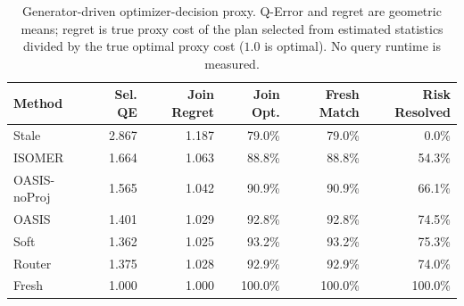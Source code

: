 \begin{table}[t]
  \centering
  \small
  \caption{Generator-driven optimizer-decision proxy. Q-Error and regret are geometric means; regret is true proxy cost of the plan selected from estimated statistics divided by the true optimal proxy cost ($1.0$ is optimal). No query runtime is measured.}
  \label{tab:optimizer_decision_proxy}
  \setlength{\tabcolsep}{4pt}
  \begin{tabular}{lrrrrr}
    \toprule
    Method & Sel. QE & Join Regret & Join Opt. & Fresh Match & Risk Resolved \\
    \midrule
    Stale & 2.867 & 1.187 & 79.0\% & 79.0\% & 0.0\% \\
    ISOMER & 1.664 & 1.063 & 88.8\% & 88.8\% & 54.3\% \\
    OASIS-noProj & 1.565 & 1.042 & 90.9\% & 90.9\% & 66.1\% \\
    OASIS & 1.401 & 1.029 & 92.8\% & 92.8\% & 74.5\% \\
    Soft & 1.362 & 1.025 & 93.2\% & 93.2\% & 75.3\% \\
    Router & 1.375 & 1.028 & 92.9\% & 92.9\% & 74.0\% \\
    Fresh & 1.000 & 1.000 & 100.0\% & 100.0\% & 100.0\% \\
    \bottomrule
  \end{tabular}
\end{table}
